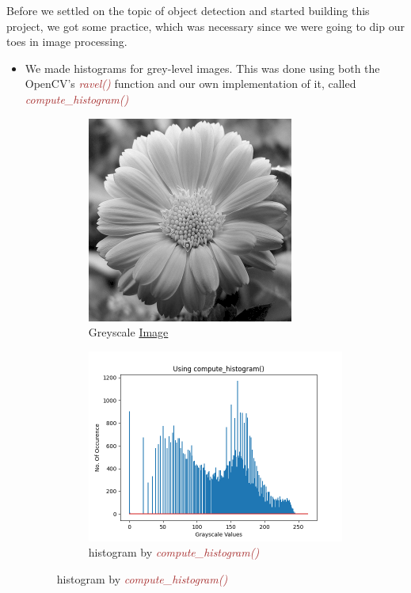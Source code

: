 \documentclass[a4paper]{article}
\begin{document}
Before we settled on the topic of object detection and started building this project, we got some practice, which was necessary since we were going to dip our toes in image processing.

\begin{itemize}
    \item We made histograms for grey-level images. This was done using both the OpenCV's \textcolor{brown}{\textit{ravel()}} function and our own implementation of it, called \textcolor{brown}{\textit{compute\_histogram()}}
    \begin{figure}[h!]
        \centering
        \begin{subfigure}[b]{\linewidth}
            \centering
            \includegraphics[width=0.3\linewidth]{Pictures/histogram/greyscale.png}
            \caption{Greyscale \href{https://www.publicdomainpictures.net/en/view-image.php?image=5675&amp;picture=flowers-6}{Image}}
        \end{subfigure}
        \begin{subfigure}[b]{0.4\linewidth}
            \centering
            \includegraphics[width=\linewidth]{Pictures/histogram/compute_histogram.png}
            \caption{histogram by \textcolor{brown}{\textit{compute\_histogram()}}}

\end{subfigure}
\end{figure}
\end{itemize}
\end{document}
